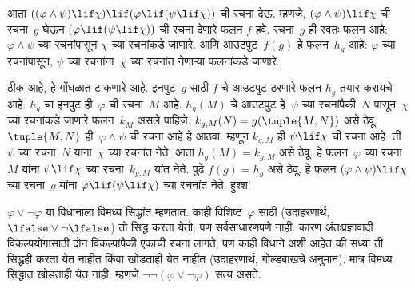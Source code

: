 \begin{ex}
आता $((\varphi \land \psi) \lif \chi) \lif (\varphi \lif
(\psi \lif \chi))$ ची रचना देऊ. म्हणजे, $(\varphi \land
\psi) \lif \chi$ ची रचना~$g$ घेऊन $(\varphi \lif (\psi \lif
\chi))$ ची रचना देणारे फलन $f$ हवे. रचना~$g$
ही स्वतः फलन आहे: $\varphi \land \psi$ च्या रचनांपासून
$\chi$ च्या रचनांकडे जाणारे. आणि आउटपुट~$f(g)$
हे फलन~$h_g$ आहे: $\varphi$ च्या रचनांपासून, $\psi$
च्या रचनांना~$\chi$ च्या रचनांत नेणाऱ्या फलनांकडे जाणारे.

ठीक आहे, हे गोंधळात टाकणारे आहे. इनपुट~$g$ साठी
$f$ चे आउटपुट ठरणारे फलन $h_g$ तयार करायचे आहे.
$h_g$ चा इनपुट ही~$\varphi$ ची रचना~$M$ आहे.
$h_g(M)$ चे आउटपुट हे~$\psi$ च्या रचनांपैकी~$N$
पासून~$\chi$ च्या रचनांकडे जाणारे फलन~$k_M$ असले
पाहिजे. $k_{g,M}(N) = g(\tuple{M, N})$ असे ठेवू.
$\tuple{M, N}$ ही~$\varphi \land \psi$ ची रचना आहे हे
आठवा. म्हणून $k_{g,M}$ ही $\psi \lif \chi$ ची रचना
आहे: ती~$\psi$ च्या रचना~$N$ यांना~$\chi$ च्या
रचनांत नेते. आता $h_g(M) = k_{g,M}$ असे ठेवू.
हे फलन~$\varphi$ च्या रचना~$M$ यांना $\psi
\lif \chi$ च्या रचना~$k_{g,M}$ यांत नेते. पुढे
$f(g) = h_g$ असे ठेवू. हे फलन $(\varphi \land \psi)
\lif \chi$ च्या रचना~$g$ यांना $\varphi \lif (\psi \lif \chi)$
च्या रचनांत नेते. हुश्श!{}
\end{ex}

$\varphi \lor \lnot \varphi$ या विधानाला विमध्य सिद्धांत
म्हणतात. काही विशिष्ट~$\varphi$ साठी (उदाहरणार्थ,
$\lfalse \lor \lnot \lfalse$) तो सिद्ध करता येतो;
पण सर्वसाधारणपणे नाही. कारण अंतःप्रज्ञावादी
विकल्पयोगासाठी दोन विकल्पांपैकी एकाची रचना लागते;
पण काही विधाने अशी आहेत की सध्या ती सिद्धही
करता येत नाहीत किंवा खोडताही येत नाहीत
(उदाहरणार्थ, गोल्डबाखचे अनुमान). मात्र विमध्य
सिद्धांत खोडताही येत नाही: म्हणजे $\lnot \lnot (\varphi
\lor \lnot \varphi)$ सत्य असते.

